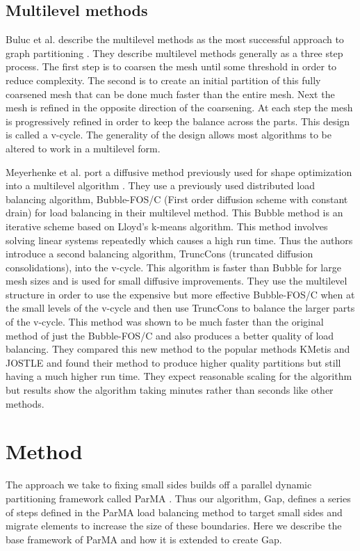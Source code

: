 \documentclass{thesis}
\begin{document}
\section{Multilevel methods}
Buluc et al. describe the multilevel methods as the most successful approach to 
graph partitioning \cite{surveygraph}. They describe multilevel methods 
generally as a three step process. The first step is to coarsen the mesh 
until some threshold in order to reduce complexity. The second is to create 
an initial partition of this fully coarsened mesh that can be done much 
faster than the entire mesh. Next the mesh is refined in the opposite direction
of the coarsening. At each step the mesh is progressively refined in order to
keep the balance across the parts. This design is called a v-cycle. The 
generality of the design allows most algorithms to be altered to work in a 
multilevel form. 

Meyerhenke et al. port a diffusive method previously used for 
shape optimization into a multilevel algorithm \cite{multidiffuse}. They use a 
previously used distributed load balancing algorithm, Bubble-FOS/C (First order
diffusion scheme with constant drain) for load balancing in their multilevel
method. This Bubble method is an iterative scheme based on Lloyd's k-means 
algorithm. This method involves solving linear systems repeatedly which causes 
a high run time. Thus the authors introduce a second balancing algorithm, 
TruncCons (truncated diffusion consolidations), into the v-cycle. This 
algorithm is faster than Bubble for large mesh sizes and is used for small
diffusive improvements. They use the multilevel structure in order to use 
the expensive but more effective Bubble-FOS/C when at the small levels of the 
v-cycle and then use TruncCons to balance the larger parts of the v-cycle. 
This method was shown to be much faster than the original method 
of just the Bubble-FOS/C and also produces a better quality of load balancing. 
They compared this new method to the popular methods KMetis and JOSTLE and 
found their method to produce higher quality partitions but still having a
much higher run time. They expect reasonable scaling for the algorithm but 
results show the algorithm taking minutes rather than seconds like other 
methods.

\chapter{Method}

The approach we take to fixing small sides builds off a parallel 
dynamic partitioning framework called ParMA \cite{parma}. Thus our algorithm, Gap,
 defines a series of steps defined in the ParMA load balancing method to target
 small sides and migrate elements to increase the size of these boundaries. Here 
we describe the base framework of ParMA and how it is extended to create Gap.
\end{document}
